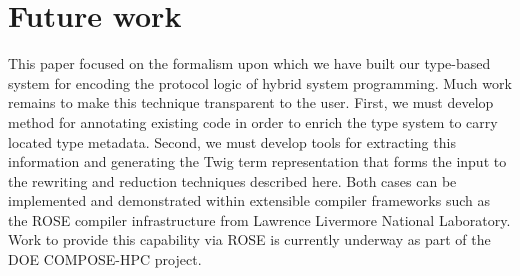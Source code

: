 
\section{Future work}
\label{sec:future-work}

This paper focused on the formalism upon which we have built our type-based system for encoding the protocol logic of hybrid system programming. Much work remains to make this technique transparent to the user. First, we must develop method for annotating existing code in order to enrich the type system to carry located type metadata. Second, we must develop tools for extracting this information and generating the Twig term representation that forms the input to the rewriting and reduction techniques described here. Both cases can be implemented and demonstrated within extensible compiler frameworks such as the ROSE compiler infrastructure from Lawrence Livermore National Laboratory. Work to provide this capability via ROSE is currently underway as part of the DOE COMPOSE-HPC project.

